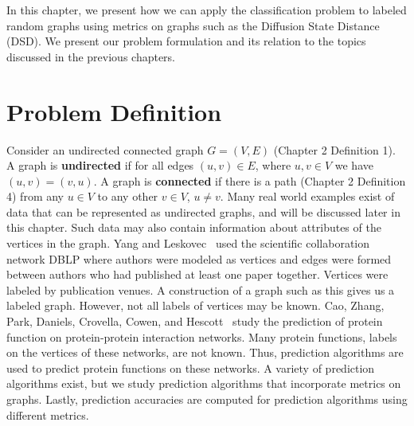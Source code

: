 In this chapter, we present how we can apply the classification problem to labeled random graphs using metrics on graphs such as the Diffusion State Distance (DSD). We present our problem formulation and its relation to the topics discussed in the previous chapters.

\section{Problem Definition}
Consider an undirected connected graph $G = (V,E)$ (Chapter 2 Definition 1). A graph is \textbf{undirected} if for all edges $(u,v) \in E$, where $u,v \in V$ we have $(u,v) = (v,u)$. A graph is \textbf{connected} if there is a path (Chapter 2 Definition 4) from any $u \in V$ to any other $v \in V$, $u \neq v$. Many real world examples exist of data that can be represented as undirected graphs, and will be discussed later in this chapter. Such data may also contain information about attributes of the vertices in the graph. Yang and Leskovec~\cite{DBLP:journals/corr/abs-1205-6233} used the scientific collaboration network DBLP where authors were modeled as vertices and edges were formed between authors who had published at least one paper together. Vertices were labeled by publication venues. A construction of a graph such as this gives us a labeled graph. However, not all labels of vertices may be known. Cao, Zhang, Park, Daniels, Crovella, Cowen, and Hescott~\cite{10.1371/journal.pone.0076339} study the prediction of protein function on protein-protein interaction networks. Many protein functions, labels on the vertices of these networks, are not known. Thus, prediction algorithms are used to predict protein functions on these networks. A variety of prediction algorithms exist, but we study prediction algorithms that incorporate metrics on graphs. Lastly, prediction accuracies are computed for prediction algorithms using different metrics.
